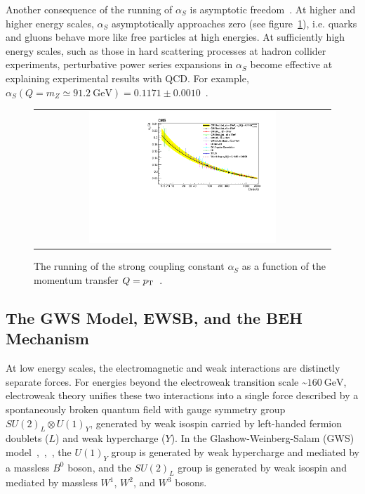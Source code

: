 Another consequence of the running of $\alpha_S$ is asymptotic freedom~\cite{PhysRevLett.30.1343}.
At higher and higher energy scales, $\alpha_S$ asymptotically approaches zero (see figure~\ref{alphaS_running}), i.e. quarks and gluons behave more like free particles at high energies.
At sufficiently high energy scales, such as those in hard scattering processes at hadron collider experiments, perturbative power series expansions in $\alpha_S$ become effective at explaining experimental results with QCD.
For example, $\alpha_S(Q = m_Z \simeq  \SI{91.2}{\GeV}) = 0.1171 \pm 0.0010$~\cite{PhysRevD.103.034028}.
\begin{figure}[htb]
  \begin{center}
    \begin{tabular}{c}
        \includegraphics[width=0.65\textwidth]{fig_Theory/alphaS_running.pdf}
    \end{tabular}
    \caption{The running of the strong coupling constant $\alpha_S$ as a function of the momentum transfer $Q = p_{\mathrm{T}}$~\cite{alphaS_running}.
            }
    \label{alphaS_running}
  \end{center}
\end{figure}

\subsection{The GWS Model, EWSB, and the BEH Mechanism}
At low energy scales, the electromagnetic and weak interactions are distinctly separate forces.
For energies beyond the electroweak transition scale \sim$\SI{160}{\GeV}$, electroweak theory unifies these two interactions into a single force described by a spontaneously broken quantum field with gauge symmetry group $SU(2)_L \otimes U(1)_Y$, generated by weak isospin carried by left-handed fermion doublets ($L$) and weak hypercharge ($Y$).
In the Glashow-Weinberg-Salam (GWS) model~\cite{GLASHOW1961579},~\cite{PhysRevLett.19.1264},~\cite{doi:10.1142/9789812795915_0034}, the $U(1)_Y$ group is generated by weak hypercharge and mediated by a massless $B^0$ boson, and the $SU(2)_L$ group is generated by weak isospin and mediated by massless $W^1$, $W^2$, and $W^3$ bosons.

